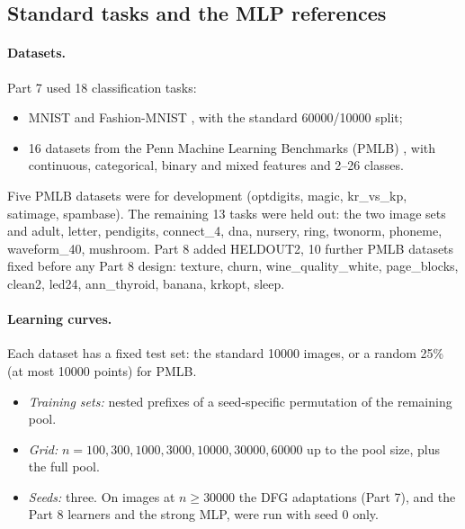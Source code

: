 \subsection{Standard tasks and the MLP references}\label{sec:stdsetup}

\paragraph{Datasets.} Part 7 used 18 classification tasks:
\begin{itemize}
\item MNIST \cite{lecun1998mnist} and Fashion-MNIST \cite{xiao2017fashion}, with the standard 60000/10000 split;
\item 16 datasets from the Penn Machine Learning Benchmarks (PMLB) \cite{olson2017pmlb}, with continuous, categorical, binary and mixed features and 2--26 classes.
\end{itemize}
Five PMLB datasets were for development (optdigits, magic, kr\_vs\_kp, satimage, spambase). The remaining 13 tasks were held out: the two image sets and adult, letter, pendigits, connect\_4, dna, nursery, ring, twonorm, phoneme, waveform\_40, mushroom. Part 8 added HELDOUT2, 10 further PMLB datasets fixed before any Part 8 design: texture, churn, wine\_quality\_white, page\_blocks, clean2, led24, ann\_thyroid, banana, krkopt, sleep.

\paragraph{Learning curves.} Each dataset has a fixed test set: the standard 10000 images, or a random 25\% (at most 10000 points) for PMLB.
\begin{itemize}
\item \emph{Training sets:} nested prefixes of a seed-specific permutation of the remaining pool.
\item \emph{Grid:} $n=100,300,1000,3000,10000,30000,60000$ up to the pool size, plus the full pool.
\item \emph{Seeds:} three. On images at $n\ge30000$ the DFG adaptations (Part 7), and the Part 8 learners and the strong MLP, were run with seed 0 only.
\end{itemize}

